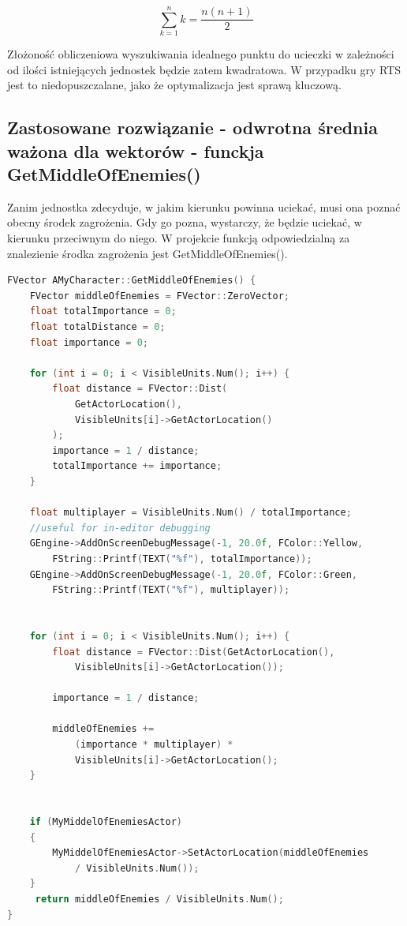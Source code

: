 \documentclass[12pt]{report}
\begin{document}
$$\sum\limits_{k=1}^n k = \frac{n(n+1)}{2}$$

Złożoność obliczeniowa wyszukiwania idealnego punktu do ucieczki w zależności od ilości istniejących jednostek będzie zatem kwadratowa. W przypadku gry RTS jest to niedopuszczalane, jako że optymalizacja jest sprawą kluczową.

\subsection{Zastosowane rozwiązanie - odwrotna średnia ważona dla wektorów - funckja GetMiddleOfEnemies()}

Zanim jednostka zdecyduje, w jakim kierunku powinna uciekać, musi ona poznać obecny środek zagrożenia. Gdy go pozna, wystarczy, że będzie uciekać, w kierunku przeciwnym do niego. W projekcie funkcją odpowiedzialną za znalezienie środka zagrożenia jest GetMiddleOfEnemies().

\begin{lstlisting}[language=C++, backgroundcolor=\color{black!5}, basicstyle=\footnotesize, caption=Funkcja GetMiddleOfEnemies() w klasie AMyCharacter]
FVector AMyCharacter::GetMiddleOfEnemies() {
	FVector middleOfEnemies = FVector::ZeroVector;
	float totalImportance = 0;		
	float totalDistance = 0;
	float importance = 0;

	for (int i = 0; i < VisibleUnits.Num(); i++) {
		float distance = FVector::Dist(
		    GetActorLocation(), 
		    VisibleUnits[i]->GetActorLocation()
		);
		importance = 1 / distance;
		totalImportance += importance;
	}

	float multiplayer = VisibleUnits.Num() / totalImportance;
	//useful for in-editor debugging
	GEngine->AddOnScreenDebugMessage(-1, 20.0f, FColor::Yellow, 
	    FString::Printf(TEXT("%f"), totalImportance));
	GEngine->AddOnScreenDebugMessage(-1, 20.0f, FColor::Green, 
	    FString::Printf(TEXT("%f"), multiplayer));


	for (int i = 0; i < VisibleUnits.Num(); i++) {
		float distance = FVector::Dist(GetActorLocation(), 
		    VisibleUnits[i]->GetActorLocation());

		importance = 1 / distance;

		middleOfEnemies += 
		    (importance * multiplayer) *  
		    VisibleUnits[i]->GetActorLocation();
	}

	
	if (MyMiddelOfEnemiesActor)
	{
		MyMiddelOfEnemiesActor->SetActorLocation(middleOfEnemies 
		    / VisibleUnits.Num());
	}
	 return middleOfEnemies / VisibleUnits.Num();
}
\end{lstlisting}
\end{document}

